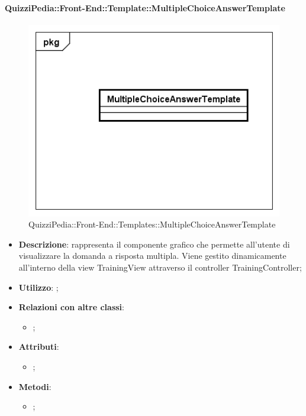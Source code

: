 		\paragraph{QuizziPedia::Front-End::Template::MultipleChoiceAnswerTemplate}
		
		\label{QuizziPedia::Front-End::Templates::MultipleChoiceAnswerTemplate}
		
		\begin{figure}[h]
			\centering
			\includegraphics[scale=0.5,keepaspectratio]{UML/Classi/Front-End/QuizziPedia_Front-end_Templates_MultipleChoiceAnswerTemplate.png}
			\caption{QuizziPedia::Front-End::Templates::MultipleChoiceAnswerTemplate}
		\end{figure}
		
		\begin{itemize}
			\item \textbf{Descrizione}: rappresenta il componente grafico che permette all'utente di visualizzare la domanda a risposta multipla. Viene gestito dinamicamente all'interno della view TrainingView attraverso il controller TrainingController;
			\item \textbf{Utilizzo}: ;
			\item \textbf{Relazioni con altre classi}: 
			\begin{itemize}
				\item ;
			\end{itemize}
			\item \textbf{Attributi}: 
			\begin{itemize}
				\item ;
			\end{itemize}
			\item \textbf{Metodi}: 
			\begin{itemize}
				\item ;
			\end{itemize}
		\end{itemize}
		
